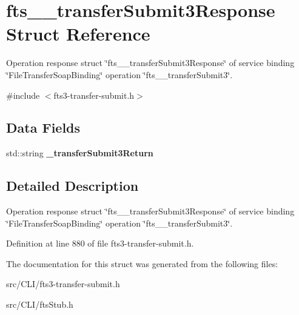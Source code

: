 \section{fts\_\-\_\-transferSubmit3Response Struct Reference}
\label{structfts____transferSubmit3Response}


Operation response struct \char`\"{}fts\_\-\_\-transferSubmit3Response\char`\"{} of service binding \char`\"{}FileTransferSoapBinding\char`\"{} operation \char`\"{}fts\_\-\_\-transferSubmit3\char`\"{}.  




{\ttfamily \#include $<$fts3-\/transfer-\/submit.h$>$}

\subsection*{Data Fields}
\begin{DoxyCompactItemize}
\item 
std::string {\bfseries \_\-transferSubmit3Return}\label{structfts____transferSubmit3Response_a721effc3fd7d254aaa5117f036ff56b0}

\end{DoxyCompactItemize}


\subsection{Detailed Description}
Operation response struct \char`\"{}fts\_\-\_\-transferSubmit3Response\char`\"{} of service binding \char`\"{}FileTransferSoapBinding\char`\"{} operation \char`\"{}fts\_\-\_\-transferSubmit3\char`\"{}. 

Definition at line 880 of file fts3-\/transfer-\/submit.h.



The documentation for this struct was generated from the following files:\begin{DoxyCompactItemize}
\item 
src/CLI/fts3-\/transfer-\/submit.h\item 
src/CLI/ftsStub.h\end{DoxyCompactItemize}
